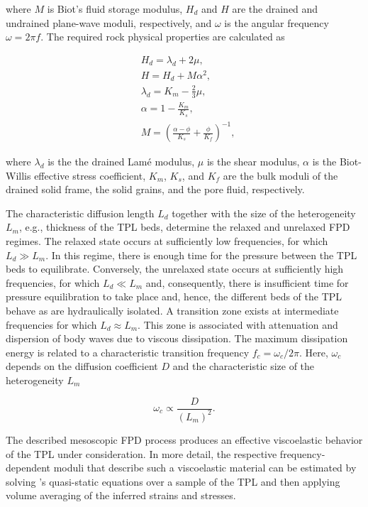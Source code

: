 \documentclass[draft]{agujournal2019}
\begin{document}
where $M$ is Biot’s fluid storage modulus, $H_d$ and $H$ are the drained and undrained plane-wave moduli, respectively, and $\omega$ is the angular frequency $\omega = 2 \pi f$.
The required rock physical properties are calculated as
\begin{linenomath*}
\begin{equation}\label{Eq.4}
\begin{split}
& H_d = \lambda_d + 2 \mu, \\
& H = H_d + M \alpha ^2, \\
& \lambda_d= K_m - \frac{2}{3} \mu, \\
& \alpha =1-\frac{K_m}{K_s},\\
& M  =\left( \frac{\alpha-\phi}{K_s} +\frac{\phi}{K_f} \right)^{-1},
\end{split}
\end{equation}
\end{linenomath*}
where $\lambda_d$ is the the drained Lamé modulus, $\mu$ is the shear modulus, $\alpha$ is the Biot-Willis effective stress coefficient, $K_m$, $K_s$, and $K_f$ are the bulk moduli of the drained solid frame, the solid grains, and the pore fluid, respectively.

The characteristic diffusion length $L_d$ together with the size of the heterogeneity $L_m$, e.g., thickness of the TPL beds, determine the relaxed and unrelaxed FPD regimes. The relaxed state occurs at sufficiently low frequencies, for which  $L_d \gg L_m$. In this regime, there is enough time for the pressure between the TPL beds to equilibrate. Conversely, the unrelaxed state occurs at sufficiently high frequencies, for which $L_d \ll L_m$ and, consequently, there is insufficient time for pressure equilibration to take place and, hence, the different beds of the TPL behave as are hydraulically isolated. A transition zone exists at intermediate frequencies for which $L_d \approx L_m$.
This zone is associated with attenuation and dispersion of body waves due to viscous dissipation. The maximum dissipation energy is related to a characteristic transition frequency $f_c= \omega_c/2\pi$. Here, $\omega_c$ depends on the diffusion coefficient $D$ and the characteristic size of the heterogeneity $L_m$ \cite{Muller2006}
\begin{linenomath*}
\begin{equation}\label{Eq.5}
\omega_c \propto \frac{D}{(L_m)^2}.
\end{equation}
\end{linenomath*}

The described mesoscopic FPD process produces an effective viscoelastic behavior of the TPL under consideration. In more detail, the respective frequency-dependent  moduli that describe such a viscoelastic material can be estimated by solving \citeauthor{Biot1941}'s \citeyear{Biot1941} quasi-static equations over a sample of the TPL and then applying volume averaging of the inferred strains and stresses.
\end{document}
